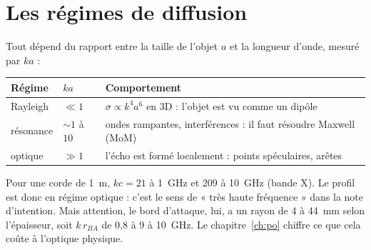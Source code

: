 \section{Les régimes de diffusion}
Tout dépend du rapport entre la taille de l'objet $a$ et la longueur d'onde, mesuré par $ka$ :
\begin{center}
\begin{tabular}{lll}
\toprule
Régime & $ka$ & Comportement \\
\midrule
Rayleigh & $\ll1$ & $\sigma\propto k^4a^6$ en 3D : l'objet est vu comme un dipôle \\
résonance & $\sim1$ à $10$ & ondes rampantes, interférences : il faut résoudre Maxwell (MoM) \\
optique & $\gg1$ & l'écho est formé localement : points spéculaires, arêtes \\
\bottomrule
\end{tabular}
\end{center}
Pour une corde de 1~m, $kc=21$ à 1~GHz et 209 à 10~GHz (bande X). Le profil est donc en régime optique : c'est le sens de « très haute fréquence » dans la note d'intention. Mais attention, le bord d'attaque, lui, a un rayon de 4 à 44~mm selon l'épaisseur, soit $k\,r_{BA}$ de 0,8 à 9 à 10~GHz. Le chapitre~\ref{ch:po} chiffre ce que cela coûte à l'optique physique.

